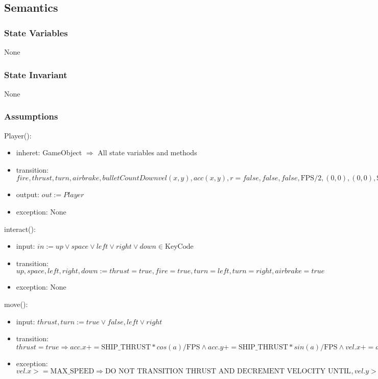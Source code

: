 \documentclass[12pt]{article}
\begin{document}
\subsection* {Semantics}

\subsubsection* {State Variables}

None

\subsubsection* {State Invariant}

None

\subsubsection* {Assumptions}

Player():
\begin{itemize}
    \item inheret: GameObject $\Rightarrow$ All state variables and methods
    \item transition: $ fire, thrust, turn, airbrake, bulletCountDown vel(x,y), acc(x,y), r = false, false, false, \mbox{FPS}/2, (0,0), (0,0), \mbox{SHIP\_SIZE/2}$
    \item output: $out := Player$
    \item exception: None
\end{itemize}

\noindent interact():
\begin{itemize}
  \item input: $in := up \lor space \lor left \lor right \lor down \in \mbox{KeyCode}$
  \item transition: $up, space, left, right, down := thrust = true, fire = true, turn = left, turn = right, airbrake = true$
  \item exception: None
\end{itemize}

\noindent move():
\begin{itemize}
  \item input: $thrust, turn := true \lor false, left \lor right$
  \item transition: $thrust = true \Rightarrow acc.x += \mbox{SHIP\_THRUST} * cos(a)/\mbox{FPS} \land acc.y += \mbox{SHIP\_THRUST} * sin(a)/\mbox{FPS} \land vel.x += acc.x \land vel.y+= acc.y, thrust = false \Rightarrow \mbox{DO NOTHING}, turn = right \Rightarrow rot = -\mbox{TURN\_SPEED}/180*\mbox{PI}/\mbox{FPS}, turn = left \Rightarrow rot =  \mbox{TURN\_SPEED}/180*\mbox{PI}/\mbox{FPS}, turn \lnot (right \lor left) \Rightarrow rot = 0,   space, left, right, down := thrust = true, fire = true, turn = left, turn = right, airbrake = true$
  \item exception: $vel.x >= \mbox{MAX\_SPEED} \Rightarrow \mbox{DO NOT TRANSITION THRUST AND DECREMENT VELOCITY UNTIL IT IS BELOW MAX SPEED}, vel.y >= max \Rightarrow \mbox{DO NOT TRANSITION THRUST AND DECREMENT VELOCITY UNTIL IT IS BELOW MAX SPEED}$
\end{itemize}
\end{document}
